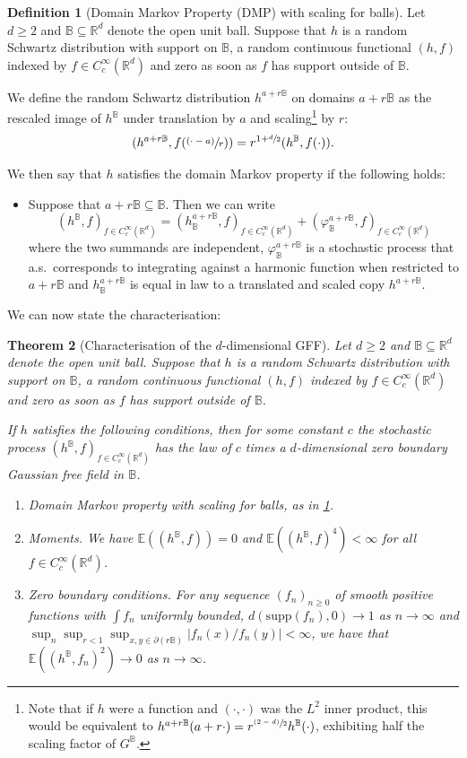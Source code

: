 \documentclass[JEP,XML,SOM,Unicode,published]{cedram}
\newcommand{\psfrac}[2]{\sfrac{(#1)}{#2}}
\newtheorem{theorem}{Theorem}
\theoremstyle{definition}
\newtheorem{definition}[theorem]{Definition}
\newcommand{\R}{\mathbb{R}}
\newcommand{\E}{\mathbb{E}}
\newcommand{\B}{\mathbb{B}}\let\D\B\let\Ub\B
\begin{document}
\begin{definition}[Domain Markov Property (DMP) with scaling for balls]\label{def:dmp}
Let $d \geq 2$ and $\D \subseteq \R^d$ denote the open unit ball. Suppose that $h$ is a random Schwartz distribution with support on $\D$, \ie a random continuous functional $(h,f)$ indexed by $f \in C_c^\infty(\R^d)$ and zero as soon as $f$ has support outside of $\D$.

We define the random Schwartz distribution $h^{a+r\D}$ on domains $a + r\D$ as the rescaled image of $h^\D$ under translation by $a$ and scaling\footnote{Note that if $h$ were a function and $(
\cdot,
\cdot)$ was the $L^2$ inner product, this would be equivalent to $h^{a+r\B}(a+r\cdot)=r^{\psfrac{2-d}{2}}h^\B(\cdot)$, exhibiting half the scaling factor of $G^\B$.} by $r$:
\[
(h^{a+r\D},f(\psfrac{\cdot - a}{r}))=r^{1+\sfrac{d}{2}}(h^\D,f(\cdot)).
\]

We then say that $h$ satisfies the domain Markov property if the following holds:
\begin{itemize}
\item Suppose that $a+r\D \subseteq \D$. Then
we can write
\[
(h^\D,f)_{f\in C_c^\infty(\R^d)}=(h^{a+r\D}_\D,f)_{f\in C_c^\infty(\R^d)}+(\varphi^{a+r\D}_\D,f)_{f\in C_c^\infty(\R^d)}
\]
where the two summands are independent, $\varphi_\D^{a+r\D}$ is a stochastic process that a.s.\ corresponds to integrating against a harmonic function when restricted to $a+r\D$ and
$h_\B^{a+r\B}$ is equal in law to a translated and scaled copy $h^{a+r\D}$.
\end{itemize}
\end{definition}

We can now state the characterisation:

\begin{theorem}[Characterisation of the $d$-dimensional GFF]\label{thm_main}
Let $d \geq 2$ and $\D \subseteq \R^d$ denote the open unit ball. Suppose that $h$ is a random Schwartz distribution with support on $\D$, \ie a random continuous functional $(h,f)$ indexed by $f \in C_c^\infty(\R^d)$ and zero as soon as $f$ has support outside of $\D$.

If $h$ satisfies the following conditions, then for some constant $c$ the stochastic process $(h^{\D},f)_{f\in C_c^\infty(\R^d)}$ has the law of $c$ times a $d$-dimensional zero boundary Gaussian free field in $\D$.
\begin{enumerate}
\item\label{dmp} \emph{Domain Markov property with scaling for balls}, as in \cref{def:dmp}.
\item\label{mom} \emph{Moments}. We have $\E((h^\D,f))=0$ and $\E((h^\D,f)^4)<\infty$ for all $f\in
C_c^\infty(\R^d)$.
\item\label{zbc} \emph{Zero boundary conditions}. For any sequence $(f_n)_{n\ge 0}$ of smooth positive functions with $\int f_n$ uniformly bounded, $d(\mathrm{supp}(f_n),0)\to 1$ as $n\to \infty$ and $\sup_n \sup_{r<1}\sup_{x,y\in \partial(r\B)} |f_n(x)/f_n(y)|\!<\!\infty$, we have that $\E((h^\B,f_n)^2)\!\to\! 0$ as $n\!\to\! \infty$.
\end{enumerate}
\end{theorem}
\end{document}
